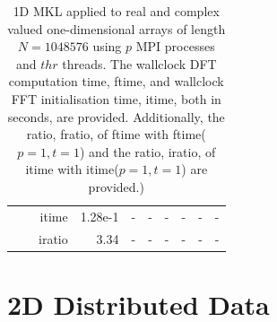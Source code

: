 \documentclass[a4paper]{article}
\begin{document}
\begin{table}[htbp]
\begin{center}
\begin{small}
\begin{tabular}{|r|r|r|r|r|r|r|r|r|r|}
           &          & itime &   1.28e-1 &  - &  - &  - &  - &  - &  - \\
           &          & iratio &   3.34 &  - &  - &  - &  - &  - &  - \\\hline
   \end{tabular}
\caption{1D MKL applied to real and complex valued one-dimensional arrays of length $N=1048576$ using $p$ MPI processes and $thr$ threads. The wallclock DFT computation time, ftime, and wallclock FFT initialisation time, itime, both in seconds, are provided. Additionally, the ratio, fratio, of ftime  with ftime($p=1,t=1$) and the ratio, iratio, of itime  with itime($p=1,t=1$) are provided.) }\label{Tbl:MKL1d1048576}
\end{small}
\end{center}
\end{table}

\clearpage

\section{2D Distributed Data}\label{App:2Ddist}
\end{document}
